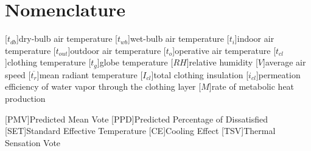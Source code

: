 
\section*{Nomenclature}
\renewcommand{\baselinestretch}{0.75}\normalsize
\renewcommand{\aclabelfont}[1]{\textsc{\acsfont{#1}}}
\begin{acronym}[longest]

    [$t_{db}$]{dry-bulb air temperature}
    [$t_{wb}$]{wet-bulb air temperature}
    [$t_{i}$]{indoor air temperature}
    [$t_{out}$]{outdoor air temperature}
    [$t_{o}$]{operative air temperature}
    [$t_{cl}$]{clothing temperature}
    [$t_{g}$]{globe temperature}
    [$RH$]{relative humidity\acroextra{, \%}}
    [$V$]{average air speed}
    [$\overline{t_{r}}$]{mean radiant temperature}
    [$I_{cl}$]{total clothing insulation}
    [$i_{cl}$]{permeation efficiency of water vapor through the clothing layer}
    [$M$]{rate of metabolic heat production}

    [PMV]{Predicted Mean Vote}
    [PPD]{Predicted Percentage of Dissatisfied\acroextra{, \%}}
    [SET]{Standard Effective Temperature}
    [CE]{Cooling Effect}
    [TSV]{Thermal Sensation Vote}

\end{acronym}
\renewcommand{\baselinestretch}{1}\normalsize
